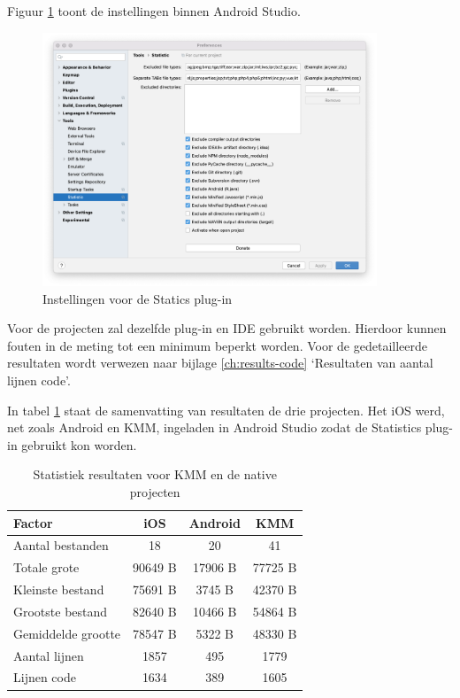 Figuur \ref{fig:M-test-lijnen-code-settings} toont de instellingen binnen Android Studio.
\begin{figure}[h!]
    \centering
    \includegraphics[width=10cm]{img/statistics-settings.png}
    \caption{Instellingen voor de Statics plug-in}
    \label{fig:M-test-lijnen-code-settings}
\end{figure}


Voor de projecten zal dezelfde plug-in en IDE gebruikt worden. Hierdoor kunnen fouten in de meting tot een minimum beperkt worden. Voor de gedetailleerde resultaten wordt verwezen naar bijlage \ref{ch:results-code} `Resultaten van aantal lijnen code'.

In tabel \ref{T:lines-overzicht} staat de samenvatting van resultaten de drie projecten. Het iOS werd, net zoals Android en KMM, ingeladen in Android Studio zodat de Statistics plug-in gebruikt kon worden.

\begin{table}[H]
    \centering
    \caption{Statistiek resultaten voor KMM en de native projecten}
    \begin{tabular}{|l|c|c|c|}
        \hline
        {\textbf{Factor}} & {\textbf{iOS}} &\textbf{Android} &\textbf{KMM} \\ \hline \hline
        Aantal bestanden&18&20&41\\ \hline
        Totale grote&90649 B&17906 B&77725 B\\ \hline
        Kleinste bestand&75691 B&3745 B&42370 B\\ \hline
        Grootste bestand&82640 B&10466 B&54864 B\\ \hline
        Gemiddelde grootte&78547 B&5322 B&48330 B\\ \hline
        Aantal lijnen&1857&495&1779\\ \hline
        Lijnen code&1634&389&1605\\ \hline
    \end{tabular}
    \label{T:lines-overzicht}
\end{table}

